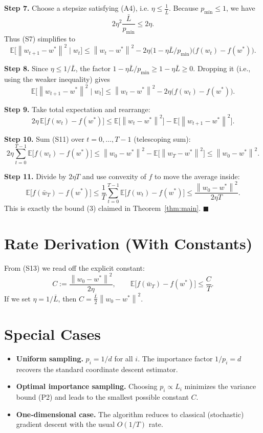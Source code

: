 \documentclass{article}
\newcommand{\E}{\mathbb{E}}
\newcommand{\norm}[1]{\left\|#1\right\|}
\begin{document}
\noindent\textbf{Step 7.} Choose a stepsize satisfying (A4), i.e. $\eta\le\frac{1}{\bar L}$. Because $p_{\min}\le1$, we have
\[
2\eta^2\frac{\bar L}{p_{\min}}\le2\eta.
\tag{S8}
\]
Thus (S7) simplifies to
\[
\E\!\big[\norm{w_{t+1}-w^*}^2\mid w_t\big]
\le \norm{w_t-w^*}^2-2\eta\big(1-\eta\bar L/p_{\min}\big)\big(f(w_t)-f(w^*)\big).
\tag{S9}
\]

\noindent\textbf{Step 8.} Since $\eta\le 1/\bar L$, the factor $1-\eta\bar L/p_{\min}\ge 1-\eta\bar L\ge0$. Dropping it (i.e., using the weaker inequality) gives
\[
\E\!\big[\norm{w_{t+1}-w^*}^2\mid w_t\big]
\le \norm{w_t-w^*}^2-2\eta\big(f(w_t)-f(w^*)\big).
\tag{S10}
\]

\noindent\textbf{Step 9.} Take total expectation and rearrange:
\[
2\eta\,\E\!\big[f(w_t)-f(w^*)\big]\le
\E\!\big[\norm{w_t-w^*}^2\big]-\E\!\big[\norm{w_{t+1}-w^*}^2\big].
\tag{S11}
\]

\noindent\textbf{Step 10.} Sum (S11) over $t=0,\dots,T-1$ (telescoping sum):
\[
2\eta\sum_{t=0}^{T-1}\E\!\big[f(w_t)-f(w^*)\big]
\le \norm{w_0-w^*}^2-\E\!\big[\norm{w_T-w^*}^2\big]
\le \norm{w_0-w^*}^2.
\tag{S12}
\]

\noindent\textbf{Step 11.} Divide by $2\eta T$ and use convexity of $f$ to move the average inside:
\[
\E\!\big[f(\bar w_T)-f(w^*)\big]
\le\frac{1}{T}\sum_{t=0}^{T-1}\E\!\big[f(w_t)-f(w^*)\big]
\le\frac{\norm{w_0-w^*}^2}{2\eta T}.
\tag{S13}
\]
This is exactly the bound (3) claimed in Theorem~\ref{thm:main}. \hfill $\blacksquare$

\section*{Rate Derivation (With Constants)}
From (S13) we read off the explicit constant:
\[
C:=\frac{\norm{w_0-w^*}^2}{2\eta},
\qquad
\E\!\big[f(\bar w_T)-f(w^*)\big]\le \frac{C}{T}.
\]
If we set $\eta=1/\bar L$, then $C=\frac{\bar L}{2}\norm{w_0-w^*}^2$.

\section*{Special Cases}
\begin{itemize}
\item \textbf{Uniform sampling.} $p_i=1/d$ for all $i$. The importance factor $1/p_i=d$ recovers the standard coordinate descent estimator.
\item \textbf{Optimal importance sampling.} Choosing $p_i\propto L_i$ minimizes the variance bound (P2) and leads to the smallest possible constant $C$.
\item \textbf{One‑dimensional case.} The algorithm reduces to classical (stochastic) gradient descent with the usual $O(1/T)$ rate.
\end{itemize}
\end{document}
